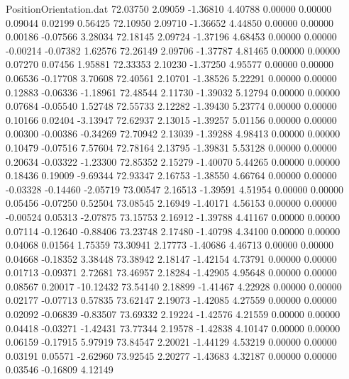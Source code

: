 \begin{filecontents}{PositionOrientation.dat}
  72.03750    2.09059   -1.36810     4.40788    0.00000    0.00000    0.09044    0.02199    0.56425
  72.10950    2.09710   -1.36652     4.44850    0.00000    0.00000    0.00186   -0.07566    3.28034
  72.18145    2.09724   -1.37196     4.68453    0.00000    0.00000   -0.00214   -0.07382    1.62576
  72.26149    2.09706   -1.37787     4.81465    0.00000    0.00000    0.07270    0.07456    1.95881
  72.33353    2.10230   -1.37250     4.95577    0.00000    0.00000    0.06536   -0.17708    3.70608
  72.40561    2.10701   -1.38526     5.22291    0.00000    0.00000    0.12883   -0.06336   -1.18961
  72.48544    2.11730   -1.39032     5.12794    0.00000    0.00000    0.07684   -0.05540    1.52748
  72.55733    2.12282   -1.39430     5.23774    0.00000    0.00000    0.10166    0.02404   -3.13947
  72.62937    2.13015   -1.39257     5.01156    0.00000    0.00000    0.00300   -0.00386   -0.34269
  72.70942    2.13039   -1.39288     4.98413    0.00000    0.00000    0.10479   -0.07516    7.57604
  72.78164    2.13795   -1.39831     5.53128    0.00000    0.00000    0.20634   -0.03322   -1.23300
  72.85352    2.15279   -1.40070     5.44265    0.00000    0.00000    0.18436    0.19009   -9.69344
  72.93347    2.16753   -1.38550     4.66764    0.00000    0.00000   -0.03328   -0.14460   -2.05719
  73.00547    2.16513   -1.39591     4.51954    0.00000    0.00000    0.05456   -0.07250    0.52504
  73.08545    2.16949   -1.40171     4.56153    0.00000    0.00000   -0.00524    0.05313   -2.07875
  73.15753    2.16912   -1.39788     4.41167    0.00000    0.00000    0.07114   -0.12640   -0.88406
  73.23748    2.17480   -1.40798     4.34100    0.00000    0.00000    0.04068    0.01564    1.75359
  73.30941    2.17773   -1.40686     4.46713    0.00000    0.00000    0.04668   -0.18352    3.38448
  73.38942    2.18147   -1.42154     4.73791    0.00000    0.00000    0.01713   -0.09371    2.72681
  73.46957    2.18284   -1.42905     4.95648    0.00000    0.00000    0.08567    0.20017  -10.12432
  73.54140    2.18899   -1.41467     4.22928    0.00000    0.00000    0.02177   -0.07713    0.57835
  73.62147    2.19073   -1.42085     4.27559    0.00000    0.00000    0.02092   -0.06839   -0.83507
  73.69332    2.19224   -1.42576     4.21559    0.00000    0.00000    0.04418   -0.03271   -1.42431
  73.77344    2.19578   -1.42838     4.10147    0.00000    0.00000    0.06159   -0.17915    5.97919
  73.84547    2.20021   -1.44129     4.53219    0.00000    0.00000    0.03191    0.05571   -2.62960
  73.92545    2.20277   -1.43683     4.32187    0.00000    0.00000    0.03546   -0.16809    4.12149

\end{filecontents}

